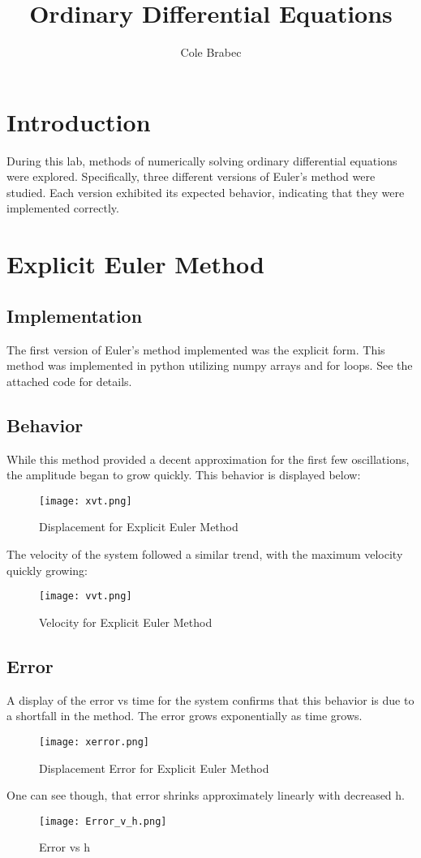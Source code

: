 \documentclass[a4paper]{article}
\title{Ordinary Differential Equations}
\author{Cole Brabec}
\begin{document}
\maketitle


\section{Introduction}
During this lab, methods of numerically solving ordinary differential equations were explored. Specifically, three different versions of Euler's method were studied. Each version exhibited its expected behavior, indicating that they were implemented correctly.
\section{Explicit Euler Method}
\subsection{Implementation}
The first version of Euler's method implemented was the explicit form. This method was implemented in python utilizing numpy arrays and for loops. See the attached code for details.
\subsection{Behavior}
While this method provided a decent approximation for the first few oscillations, the amplitude began to grow quickly. This behavior is displayed below:
\begin{figure}[H]
\centering
\texttt{[image: xvt.png]}
\caption{\label{fig: x} Displacement for Explicit Euler Method}
\end{figure}
The velocity of the system followed a similar trend, with the maximum velocity quickly growing:
\begin{figure}[H]
\centering
\texttt{[image: vvt.png]}
\caption{\label{fig: v} Velocity for Explicit Euler Method}
\end{figure}
\subsection{Error}
A display of the error vs time for the system confirms that this behavior is due to a shortfall in the method. The error grows exponentially as time grows.
\begin{figure}[H]
\centering
\texttt{[image: xerror.png]}
\caption{\label{fig: xerror} Displacement Error for Explicit Euler Method}
\end{figure}
One can see though, that error shrinks approximately linearly with decreased h.
\begin{figure}[H]
\centering
\texttt{[image: Error\_v\_h.png]}
\caption{\label{fig: h} Error vs h}
\end{figure}
\end{document}
